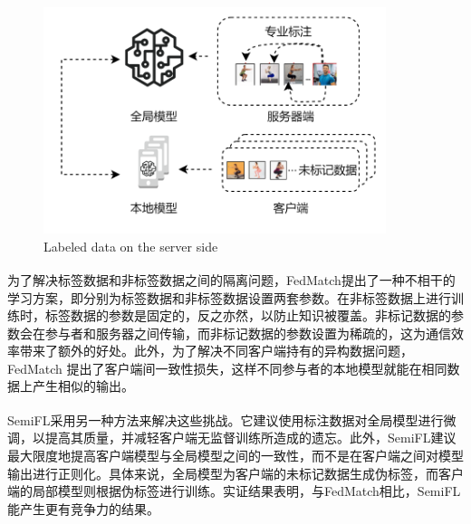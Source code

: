 \begin{figure}[h] %
	\centering %
	\includegraphics[width=10cm]{chapters/imgs/LabelAtServer} %
	{\wuhao Labeled data on the server side} %
	\label{LabelAtServer} %
\end{figure} %

为了解决标签数据和非标签数据之间的隔离问题，FedMatch\textsuperscript{\cite{jeong2020federated}}提出了一种不相干的学习方案，即分别为标签数据和非标签数据设置两套参数。在非标签数据上进行训练时，标签数据的参数是固定的，反之亦然，以防止知识被覆盖。非标记数据的参数会在参与者和服务器之间传输，而非标记数据的参数设置为稀疏的，这为通信效率带来了额外的好处。此外，为了解决不同客户端持有的异构数据问题，FedMatch 提出了客户端间一致性损失，这样不同参与者的本地模型就能在相同数据上产生相似的输出。

SemiFL\textsuperscript{\cite{diao2022semifl}}采用另一种方法来解决这些挑战。它建议使用标注数据对全局模型进行微调，以提高其质量，并减轻客户端无监督训练所造成的遗忘。此外，SemiFL建议最大限度地提高客户端模型与全局模型之间的一致性，而不是在客户端之间对模型输出进行正则化。具体来说，全局模型为客户端的未标记数据生成伪标签，而客户端的局部模型则根据伪标签进行训练。实证结果表明，与FedMatch相比，SemiFL能产生更有竞争力的结果。

